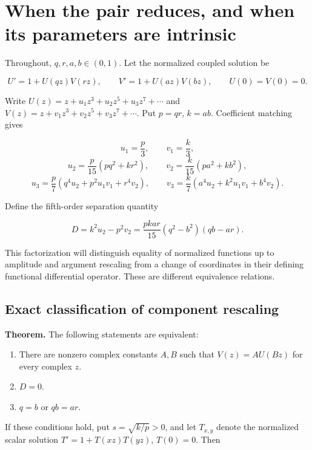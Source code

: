 \hypertarget{v11-coupled_inverse_full-when-the-pair-reduces-and-when-its-parameters-are-intrinsic}{%
\section{When the pair reduces, and when its parameters are
intrinsic}\label{v11-coupled_inverse_full-when-the-pair-reduces-and-when-its-parameters-are-intrinsic}}

Throughout, \(q,r,a,b\in(0,1)\). Let the normalized coupled solution be

\[
U'=1+U(qz)V(rz),\qquad V'=1+U(az)V(bz),\qquad U(0)=V(0)=0.
\]

Write \(U(z)=z+u_1z^3+u_2z^5+u_3z^7+\cdots\) and
\(V(z)=z+v_1z^3+v_2z^5+v_3z^7+\cdots\). Put \(p=qr\), \(k=ab\).
Coefficient matching gives

\[
u_1=\frac p3,\qquad v_1=\frac k3,
\] \[
u_2=\frac p{15}(p q^2+k r^2),\qquad
v_2=\frac k{15}(p a^2+k b^2),
\] \[
u_3=\frac p7(q^4u_2+p^2u_1v_1+r^4v_2),\qquad
v_3=\frac k7(a^4u_2+k^2u_1v_1+b^4v_2).
\]

Define the fifth-order separation quantity

\[
\boxed{D=k^2u_2-p^2v_2
=\frac{pk ar}{15}(q^2-b^2)(qb-ar).}
\]

This factorization will distinguish equality of normalized functions up
to amplitude and argument rescaling from a change of coordinates in
their defining functional differential operator. These are different
equivalence relations.

\hypertarget{v11-coupled_inverse_full-exact-classification-of-component-rescaling}{%
\subsection{Exact classification of component
rescaling}\label{v11-coupled_inverse_full-exact-classification-of-component-rescaling}}

\textbf{Theorem.} The following statements are equivalent:

\begin{enumerate}
\def\labelenumi{\arabic{enumi}.}
\tightlist
\item
  There are nonzero complex constants \(A,B\) such that \(V(z)=A U(Bz)\)
  for every complex \(z\).
\item
  \(D=0\).
\item
  \(q=b\) or \(qb=ar\).
\end{enumerate}

If these conditions hold, put \(s=\sqrt{k/p}>0\), and let \(T_{x,y}\)
denote the normalized scalar solution \(T'=1+T(xz)T(yz)\), \(T(0)=0\).
Then

